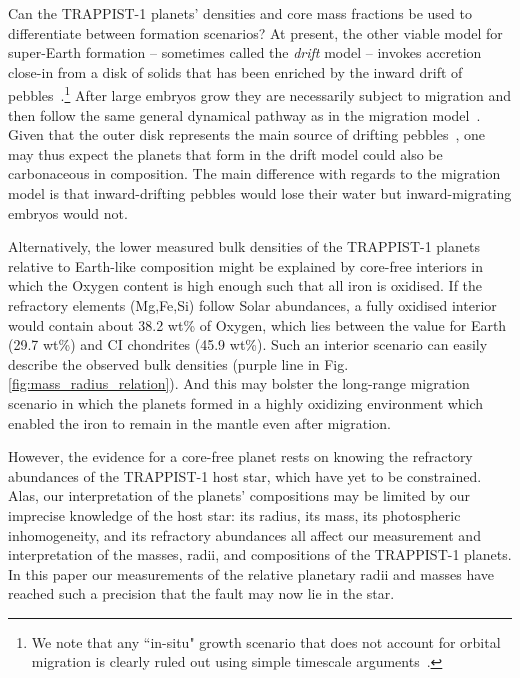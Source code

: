 \documentclass[twocolumn]{aastex63}
\begin{document}
Can the TRAPPIST-1 planets' densities and core mass fractions be used to differentiate between formation scenarios? At present, the other viable model for super-Earth formation -- sometimes called the {\em drift} model -- invokes accretion close-in from a disk of solids that has been enriched by the inward drift of pebbles~\citep{chatterjee14,chatterjee15,dawson15}.\footnote{We note that any ``in-situ" growth scenario that does not account for orbital migration is clearly ruled out using simple timescale arguments~\citep[i.e., because migration -- and even aerodynamic drift -- is far too fast to ignore; see][]{ogihara15,inamdar15,izidoro2018}.} After large embryos grow they are necessarily subject to migration and then follow the same general dynamical pathway as in the migration model~\citep[involving resonant capture and later breaking of resonant chains; see discussion in][]{raymond18d}. Given that the outer disk represents the main source of drifting pebbles~\citep{lambrechts14,ida16}, one may thus expect the planets that form in the drift model could also be carbonaceous in composition. The main difference with regards to the migration model is that inward-drifting pebbles would lose their water but inward-migrating embryos would not. %

Alternatively, the lower measured bulk densities of the TRAPPIST-1 planets relative to Earth-like composition might be explained by core-free interiors \citep{ElkinsTanton2008} in which the Oxygen content is high enough such that all iron is oxidised. If the refractory elements (Mg,Fe,Si) follow Solar abundances, a fully oxidised interior would contain about 38.2 wt\% of Oxygen, which lies between the value for Earth (29.7 wt\%) and CI chondrites (45.9 wt\%). Such an interior scenario can easily describe the observed bulk densities (purple line in Fig. \ref{fig:mass_radius_relation}).  And this may bolster the long-range migration scenario in which the planets formed in a highly oxidizing environment which enabled the iron to remain in the mantle even after migration.

However, the evidence for a core-free planet rests on knowing the refractory abundances of the TRAPPIST-1 host star, which have yet to be constrained.  Alas, our interpretation of the planets' compositions may be limited by our imprecise knowledge of the host star:  its radius, its mass, its photospheric inhomogeneity, and its refractory abundances all affect our measurement and interpretation of the masses, radii, and compositions of the TRAPPIST-1 planets.  In this paper our measurements of the relative planetary radii and masses have reached such a precision that the fault may now lie in the star.
\end{document}
